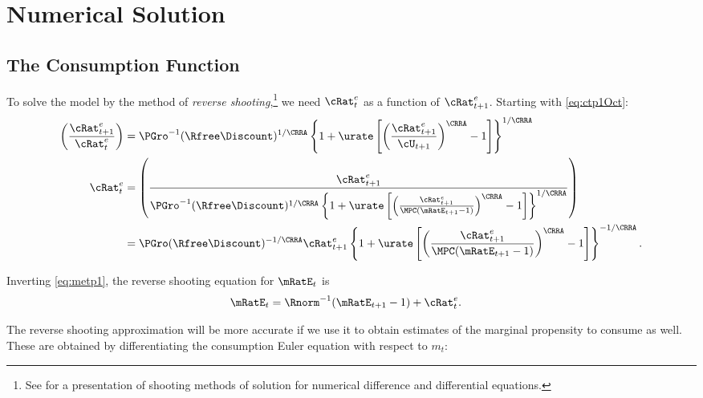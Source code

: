 \documentclass{\handout}
\begin{document}
\section{Numerical Solution}

\subsection{The Consumption Function}

To solve the model by the method of {\it reverse shooting},\footnote{See \cite{judd:book} for a presentation of shooting methods of solution for numerical difference and differential equations.} we need ${\cRat}^{e}_{t}$ as a function
of ${\cRat}^{e}_{t+1}$.  Starting with \eqref{eq:ctp1Oct}:
\begin{equation}\begin{gathered}\begin{aligned}
         \left(\frac{{\cRat}^{e}_{t+1}}{{\cRat}^{e}_{t}}\right) & =  \PGro^{-1} (\Rfree\Discount)^{1/\CRRA} \left\{1+\urate\left[\left(\frac{{\cRat}^{e}_{t+1}}{\cU_{t+1}}\right)^{\CRRA}-1\right]\right\}^{1/\CRRA}
\\       {\cRat}^{e}_{t} & =  \left(\frac{{\cRat}^{e}_{t+1}}{\PGro^{-1} (\Rfree\Discount)^{1/\CRRA} \left\{1+\urate\left[\left(\frac{{\cRat}^{e}_{t+1}}{\MPCU (\mRatE_{t+1}-1)}\right)^{\CRRA}-1\right]\right\}^{1/\CRRA} }  \right)
\\        & =  \PGro (\Rfree\Discount)^{-1/\CRRA} {\cRat}^{e}_{t+1}\left\{1+\urate\left[\left(\frac{{\cRat}^{e}_{t+1}}{\MPCU (\mRatE_{t+1}-1)}\right)^{\CRRA}-1\right]\right\}^{-1/\CRRA}        \label{eq:cReverse}.
\end{aligned}\end{gathered}\end{equation}

Inverting \eqref{eq:metp1}, the reverse shooting equation for $\mRatE_{t}$ is
\begin{equation}\begin{gathered}\begin{aligned}
        \mRatE_{t} & =  \Rnorm^{-1} (\mRatE_{t+1}-1)+{\cRat}^{e}_{t} . \label{eq:mReverse}
\end{aligned}\end{gathered}\end{equation}

The reverse shooting approximation will be more accurate if we use it to obtain estimates
of the marginal propensity to consume as well.  These are obtained 
by differentiating the consumption Euler equation with respect to $m_{t}$:
\end{document}
